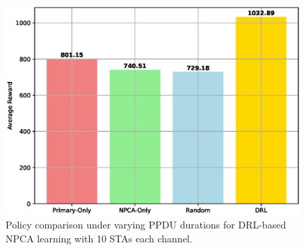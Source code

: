 \documentclass[conference]{IEEEtran}
\begin{document}
\begin{figure}
\centerline{\includegraphics[width=\columnwidth]{figure/policy_comparison_obss_100.eps}}
\caption{Policy comparison under varying PPDU durations for DRL-based NPCA learning with 10 STAs each channel.}
\label{fig:policy_comparison}
\end{figure}


\end{document}
